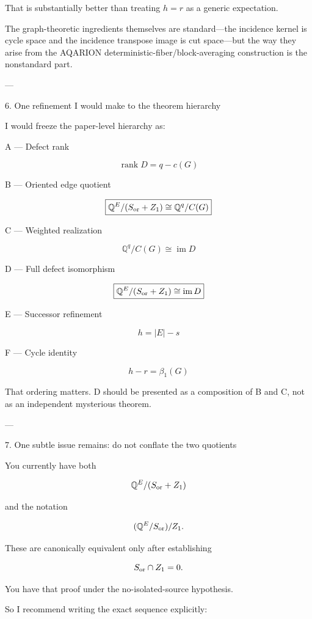 That is substantially better than treating \(h=r\) as a generic expectation.

The graph-theoretic ingredients themselves are standard—the incidence kernel is cycle space and the incidence transpose image is cut space—but the way they arise from the AQARION deterministic-fiber/block-averaging construction is the nonstandard part.


---

6. One refinement I would make to the theorem hierarchy



I would freeze the paper-level hierarchy as:

A — Defect rank

\[
\boxed{\operatorname{rank}D=q-c(G)}  
\]

B — Oriented edge quotient

\[
\boxed{  
\mathbb Q^E/(S_{\rm or}+Z_1)  
\cong  
\mathbb Q^q/C(G)  
}  
\]

C — Weighted realization

\[
\boxed{  
\mathbb Q^q/C(G)  
\cong  
\operatorname{im}D  
}  
\]

D — Full defect isomorphism

\[
\boxed{  
\mathbb Q^E/(S_{\rm or}+Z_1)  
\cong  
\operatorname{im}D  
}  
\]

E — Successor refinement

\[
\boxed{h=|E|-s}  
\]

F — Cycle identity

\[
\boxed{h-r=\beta_1(G)}  
\]

That ordering matters. D should be presented as a composition of B and C, not as an independent mysterious theorem.


---

7. One subtle issue remains: do not conflate the two quotients



You currently have both

\[
\mathbb Q^E/(S_{\rm or}+Z_1)  
\]

and the notation

\[
(\mathbb Q^E/S_{\rm or})/Z_1.  
\]

These are canonically equivalent only after establishing

\[
S_{\rm or}\cap Z_1=0.  
\]

You have that proof under the no-isolated-source hypothesis.

So I recommend writing the exact sequence explicitly:

